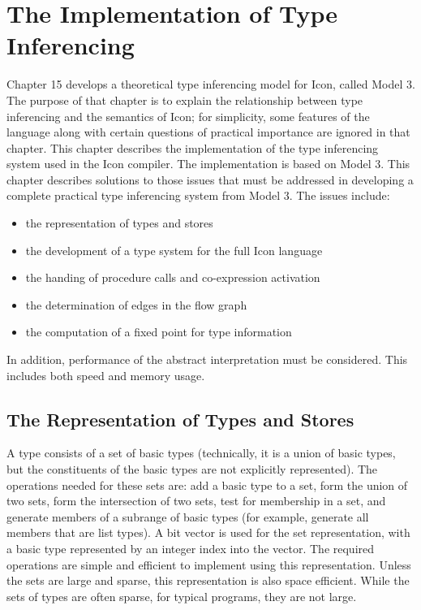 \chapter{The Implementation of Type Inferencing}

Chapter 15 develops a theoretical type inferencing model for Icon,
called Model 3. The purpose of that chapter is to explain the
relationship between type inferencing and the semantics of Icon; for
simplicity, some features of the language along with certain questions
of practical importance are ignored in that chapter. This chapter
describes the implementation of the type inferencing system used in
the Icon compiler. The implementation is based on Model 3. This
chapter describes solutions to those issues that must be addressed in
developing a complete practical type inferencing system from Model
3. The issues include:

\liststyleLxxi
\begin{itemize}
\item 
the representation of types and stores 
\item 
the development of a type system for the full Icon language 
\item 
the handing of procedure calls and co-expression activation 
\item 
the determination of edges in the flow graph 
\item 
the computation of a fixed point for type information 
\end{itemize}

In addition, performance of the abstract interpretation must be
considered. This includes both speed and memory usage.


\section{The Representation of Types and Stores}

A type consists of a set of basic types (technically, it is a union of
basic types, but the constituents of the basic types are not
explicitly represented). The operations needed for these sets are: add
a basic type to a set, form the union of two sets, form the
intersection of two sets, test for membership in a set, and generate
members of a subrange of basic types (for example, generate all
members that are list types). A bit vector is used for the set
representation, with a basic type represented by an integer index into
the vector. The required operations are simple and efficient to
implement using this representation. Unless the sets are large and
sparse, this representation is also space efficient. While the sets of
types are often sparse, for typical programs, they are not large.

